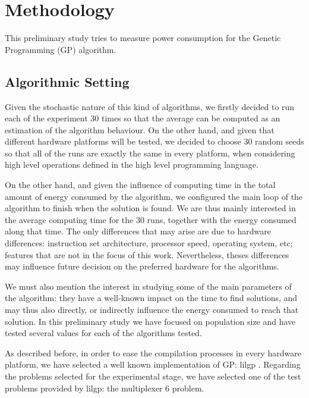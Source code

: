 \section{Methodology}
\label{methodology}

This preliminary study tries to measure power consumption for 
the Genetic Programming (GP) algorithm.

\subsection{Algorithmic Setting}

Given the stochastic nature of this kind of algorithms, we firstly decided to run each of the experiment 30 times so that the average can be computed as an estimation of the algorithm behaviour.  On the other hand, and given that different hardware platforms will be tested, we decided to choose 30 random seeds so that all of the runs are exactly the same in every platform, when considering high level operations defined in the high level programming language.

On the other hand, and given the influence of computing time in the total amount of energy consumed by the algorithm, we configured the main loop of the algorithm to finish when 
the solution is found.  We are thus mainly interested in the average computing time for the 30 runs, together with the energy consumed along that time.  The only differences that may arise are due to hardware differences:  instruction set architecture, processor speed, operating system, etc;  %
features that are not in the focus of this work.  Nevertheless, theses differences may influence future decision on the preferred hardware for the algorithms.  

We must also mention the interest in studying some of the main parameters of the algorithm:  they have a well-known impact on the time to find solutions, and may thus also directly, or indirectly influence the energy consumed to reach that solution.  In this preliminary study we have focused on population size and have tested several values for each of the algorithms tested.

As described before, in order to ease the compilation processes in every hardware platform, we have selected a well known implementation of GP:  lilgp \cite{lilgp}.
Regarding the problems selected for the experimental stage, we have selected one of the test problems provided by lilgp: the multiplexer 6 problem.

